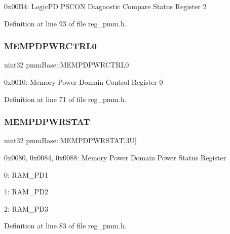 0x00\+B4\+: Logic\+PD P\+S\+C\+ON Diagnostic Compare Status Register 2 

Definition at line 93 of file reg\+\_\+pmm.\+h.

\mbox{\label{structpmmBase_a83a2d707bcb7124e426d78c97ee77f5c}} 
\subsubsection{\texorpdfstring{M\+E\+M\+P\+D\+P\+W\+R\+C\+T\+R\+L0}{MEMPDPWRCTRL0}}
{\footnotesize\ttfamily uint32 pmm\+Base\+::\+M\+E\+M\+P\+D\+P\+W\+R\+C\+T\+R\+L0}

0x0010\+: Memory Power Domain Control Register 0 

Definition at line 71 of file reg\+\_\+pmm.\+h.

\mbox{\label{structpmmBase_a84b8a30f5425d6082a63cf5a891e06dc}} 
\subsubsection{\texorpdfstring{M\+E\+M\+P\+D\+P\+W\+R\+S\+T\+AT}{MEMPDPWRSTAT}}
{\footnotesize\ttfamily uint32 pmm\+Base\+::\+M\+E\+M\+P\+D\+P\+W\+R\+S\+T\+AT\mbox{[}3\+U\mbox{]}}

0x0080, 0x0084, 0x0088\+: Memory Power Domain Power Status Register
\begin{DoxyItemize}
\item 0\+: R\+A\+M\+\_\+\+P\+D1
\item 1\+: R\+A\+M\+\_\+\+P\+D2
\item 2\+: R\+A\+M\+\_\+\+P\+D3 
\end{DoxyItemize}

Definition at line 83 of file reg\+\_\+pmm.\+h.

\mbox{\label{structpmmBase_a78201311d9bb91c7fb7f1923e0f9131e}} 
